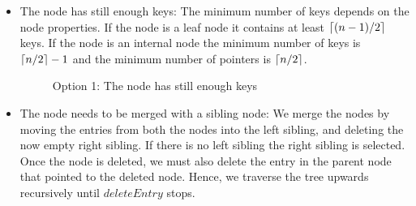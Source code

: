 \documentclass[abstracton,12pt]{scrreprt}
\DeclarePairedDelimiter\ceil{\lceil}{\rceil}
\begin{document}
\begin{itemize}
	\item The node has still enough keys: The minimum number of keys depends on the node properties. If the node is a leaf node it contains at least $\ceil{(n-1)/2}$ keys. If the node is an internal node the minimum number of keys is $\ceil{n/2}-1$ and the minimum number of pointers is $\ceil{n/2}$. 
	\begin{figure}[ht!]
		\centering
		\vspace{2mm}
		\caption{Option 1: The node has still enough keys}
		\label{fig:enoughkeys}
	\end{figure} 
		
	\item The node needs to be merged with a sibling node: We merge the nodes by moving the entries from both the nodes into the left sibling, and deleting the
	now empty right sibling. If there is no left sibling the right sibling is selected. Once the node is deleted, we must also delete the entry in the parent node that pointed to the deleted node. Hence, we traverse the tree upwards recursively until $deleteEntry$ stops.
	

\end{itemize}
\end{document}
